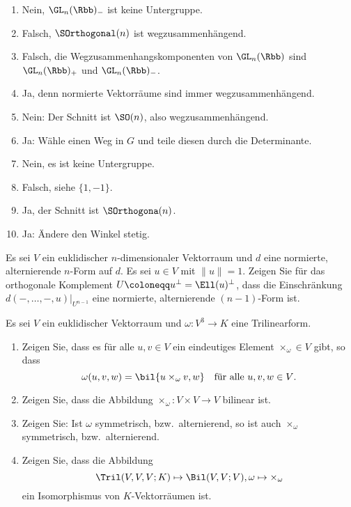 \begin{solution}
  \begin{enumerate}
    \item
      Nein, $\GL_n(\Rbb)_-$ ist keine Untergruppe.
    \item
      Falsch, $\SOrthogonal(n)$ ist wegzusammenhängend.
    \item
      Falsch, die Wegzusammenhangskomponenten von $\GL_n(\Rbb)$ sind $\GL_n(\Rbb)_+$ und $\GL_n(\Rbb)_-$.
    \item
      Ja, denn normierte Vektorräume sind immer wegzusammenhängend.
    \item
      Nein: Der Schnitt ist $\SO(n)$, also wegzusammenhängend.
    \item
      Ja: Wähle einen Weg in $G$ und teile diesen durch die Determinante.
    \item
      Nein, es ist keine Untergruppe.
    \item
      Falsch, siehe $\{1,-1\}$.
    \item
      Ja, der Schnitt ist $\SOrthogona(n)$.
    \item
      Ja: Ändere den Winkel stetig.
  \end{enumerate}
\end{solution}


\begin{question}
  Es sei $V$ ein euklidischer $n$-dimensionaler Vektorraum und $d$ eine normierte, alternierende $n$-Form auf $d$.
  Es sei $u \in V$ mit $\|u\| = 1$.
  Zeigen Sie für das orthogonale Komplement $U \coloneqq u^\perp = \Ell(u)^\perp$, dass die Einschränkung $d(-, \dotsc, -, u)|_{U^{n-1}}$ eine normierte, alternierende $(n-1)$-Form ist.
\end{question}


\begin{question}
  Es sei $V$ ein euklidischer Vektorraum und $\omega \colon V^3 \to K$ eine Trilinearform.
  \begin{enumerate}[leftmargin=*]
    \item
      Zeigen Sie, dass es für alle $u, v \in V$ ein eindeutiges Element $\times_\omega \in V$ gibt, so dass
      \[
          \omega(u, v, w)
        = \bil{u \times_\omega v, w}
        \quad
        \text{für alle $u, v, w \in V$}.
      \]
    \item
      Zeigen Sie, dass die Abbildung $\times_\omega \colon V \times V \to V$ bilinear ist.
    \item
      Zeigen Sie:
      Ist $\omega$ symmetrisch, bzw.\ alternierend, so ist auch $\times_\omega$ symmetrisch, bzw.\ alternierend.
    \item
      Zeigen Sie, dass die Abbildung
      \[
        \Tril(V, V, V; K) \mapsto \Bil(V, V; V),
        \omega
        \mapsto
        \times_\omega
      \]
      ein Isomorphismus von $K$-Vektorräumen ist.
  \end{enumerate} 
\end{question}


